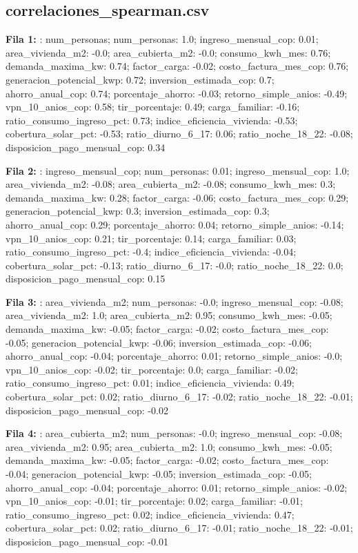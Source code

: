 \subsection*{correlaciones\_spearman.csv}
{\footnotesize\textbf{Fila 1:} : num\_personas; num\_personas: 1.0; ingreso\_mensual\_cop: 0.01; area\_vivienda\_m2: -0.0; area\_cubierta\_m2: -0.0; consumo\_kwh\_mes: 0.76; demanda\_maxima\_kw: 0.74; factor\_carga: -0.02; costo\_factura\_mes\_cop: 0.76; generacion\_potencial\_kwp: 0.72; inversion\_estimada\_cop: 0.7; ahorro\_anual\_cop: 0.74; porcentaje\_ahorro: -0.03; retorno\_simple\_anios: -0.49; vpn\_10\_anios\_cop: 0.58; tir\_porcentaje: 0.49; carga\_familiar: -0.16; ratio\_consumo\_ingreso\_pct: 0.73; indice\_eficiencia\_vivienda: -0.53; cobertura\_solar\_pct: -0.53; ratio\_diurno\_6\_17: 0.06; ratio\_noche\_18\_22: -0.08; disposicion\_pago\_mensual\_cop: 0.34\par}
{\footnotesize\textbf{Fila 2:} : ingreso\_mensual\_cop; num\_personas: 0.01; ingreso\_mensual\_cop: 1.0; area\_vivienda\_m2: -0.08; area\_cubierta\_m2: -0.08; consumo\_kwh\_mes: 0.3; demanda\_maxima\_kw: 0.28; factor\_carga: -0.06; costo\_factura\_mes\_cop: 0.29; generacion\_potencial\_kwp: 0.3; inversion\_estimada\_cop: 0.3; ahorro\_anual\_cop: 0.29; porcentaje\_ahorro: 0.04; retorno\_simple\_anios: -0.14; vpn\_10\_anios\_cop: 0.21; tir\_porcentaje: 0.14; carga\_familiar: 0.03; ratio\_consumo\_ingreso\_pct: -0.4; indice\_eficiencia\_vivienda: -0.04; cobertura\_solar\_pct: -0.13; ratio\_diurno\_6\_17: -0.0; ratio\_noche\_18\_22: 0.0; disposicion\_pago\_mensual\_cop: 0.15\par}
{\footnotesize\textbf{Fila 3:} : area\_vivienda\_m2; num\_personas: -0.0; ingreso\_mensual\_cop: -0.08; area\_vivienda\_m2: 1.0; area\_cubierta\_m2: 0.95; consumo\_kwh\_mes: -0.05; demanda\_maxima\_kw: -0.05; factor\_carga: -0.02; costo\_factura\_mes\_cop: -0.05; generacion\_potencial\_kwp: -0.06; inversion\_estimada\_cop: -0.06; ahorro\_anual\_cop: -0.04; porcentaje\_ahorro: 0.01; retorno\_simple\_anios: -0.0; vpn\_10\_anios\_cop: -0.02; tir\_porcentaje: 0.0; carga\_familiar: -0.02; ratio\_consumo\_ingreso\_pct: 0.01; indice\_eficiencia\_vivienda: 0.49; cobertura\_solar\_pct: 0.02; ratio\_diurno\_6\_17: -0.02; ratio\_noche\_18\_22: -0.01; disposicion\_pago\_mensual\_cop: -0.02\par}
{\footnotesize\textbf{Fila 4:} : area\_cubierta\_m2; num\_personas: -0.0; ingreso\_mensual\_cop: -0.08; area\_vivienda\_m2: 0.95; area\_cubierta\_m2: 1.0; consumo\_kwh\_mes: -0.05; demanda\_maxima\_kw: -0.05; factor\_carga: -0.02; costo\_factura\_mes\_cop: -0.04; generacion\_potencial\_kwp: -0.05; inversion\_estimada\_cop: -0.05; ahorro\_anual\_cop: -0.04; porcentaje\_ahorro: 0.01; retorno\_simple\_anios: -0.02; vpn\_10\_anios\_cop: -0.01; tir\_porcentaje: 0.02; carga\_familiar: -0.01; ratio\_consumo\_ingreso\_pct: 0.02; indice\_eficiencia\_vivienda: 0.47; cobertura\_solar\_pct: 0.02; ratio\_diurno\_6\_17: -0.01; ratio\_noche\_18\_22: -0.01; disposicion\_pago\_mensual\_cop: -0.01\par}
